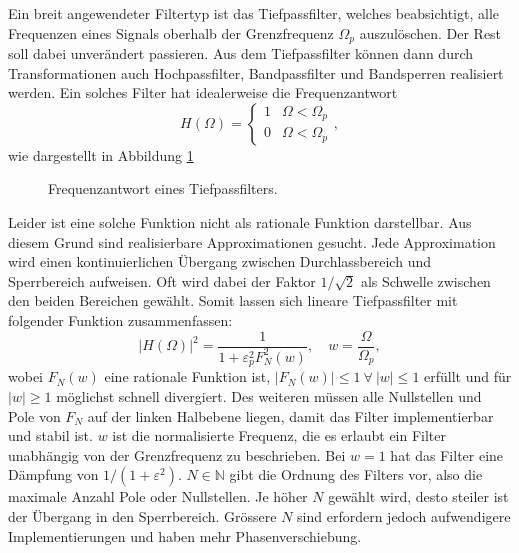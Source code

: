 Ein breit angewendeter Filtertyp ist das Tiefpassfilter, welches beabsichtigt, alle Frequenzen eines Signals oberhalb der Grenzfrequenz $\Omega_p$ auszulöschen.
Der Rest soll dabei unverändert passieren.
Aus dem Tiefpassfilter können dann durch Transformationen auch Hochpassfilter, Bandpassfilter und Bandsperren realisiert werden.
Ein solches Filter hat idealerweise die Frequenzantwort
\begin{equation}
    H(\Omega) =
    \begin{cases}
        1  & \Omega < \Omega_p \\
        0  & \Omega < \Omega_p
    \end{cases},
\end{equation}
wie dargestellt in Abbildung \ref{ellfilter:fig:lp}
\begin{figure}
    \centering
    
    \caption{Frequenzantwort eines Tiefpassfilters.}
    \label{ellfilter:fig:lp}
\end{figure}
Leider ist eine solche Funktion nicht als rationale Funktion darstellbar.
Aus diesem Grund sind realisierbare Approximationen gesucht.
Jede Approximation wird einen kontinuierlichen Übergang zwischen Durchlassbereich und Sperrbereich aufweisen.
Oft wird dabei der Faktor $1/\sqrt{2}$ als Schwelle zwischen den beiden Bereichen gewählt.
Somit lassen sich lineare Tiefpassfilter mit folgender Funktion zusammenfassen:
\begin{equation} \label{ellfilter:eq:quadratic_transfer}
    | H(\Omega)|^2 = \frac{1}{1 + \varepsilon_p^2 F_N^2(w)}, \quad w=\frac{\Omega}{\Omega_p},
\end{equation}
wobei $F_N(w)$ eine rationale Funktion ist, $|F_N(w)| \leq 1 ~\forall~ |w| \leq 1$ erfüllt und für $|w| \geq 1$ möglichst schnell divergiert.
Des weiteren müssen alle Nullstellen und Pole von $F_N$ auf der linken Halbebene liegen, damit das Filter implementierbar und stabil ist.
$w$ ist die normalisierte Frequenz, die es erlaubt ein Filter unabhängig von der Grenzfrequenz zu beschrieben.
Bei $w=1$ hat das Filter eine Dämpfung von $1/(1+\varepsilon^2)$.
$N \in \mathbb{N} $ gibt die Ordnung des Filters vor, also die maximale Anzahl Pole oder Nullstellen.
Je höher $N$ gewählt wird, desto steiler ist der Übergang in den Sperrbereich.
Grössere $N$ sind erfordern jedoch aufwendigere Implementierungen und haben mehr Phasenverschiebung.

